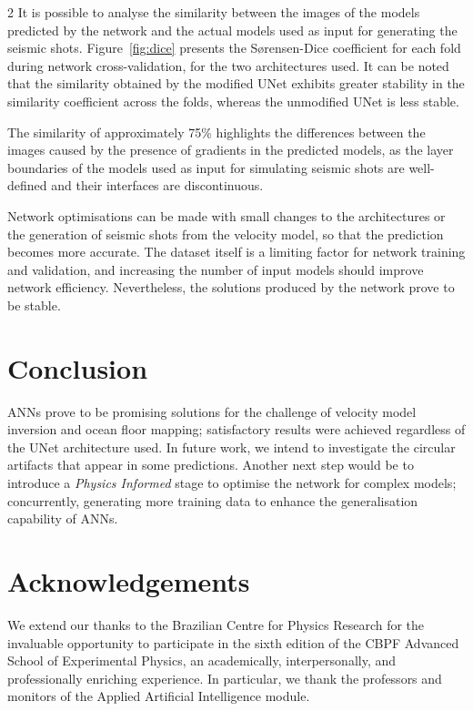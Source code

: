 \documentclass[a4paper,twoside,12pt]{article}
\begin{document}
\begin{multicols}{2}
It is possible to analyse the similarity between the images of the models predicted by the network and the actual models used as input for generating the seismic shots. Figure~\ref{fig:dice} presents the Sørensen-Dice coefficient for each fold during network cross-validation, for the two architectures used. It can be noted that the similarity obtained by the modified UNet exhibits greater stability in the similarity coefficient across the folds, whereas the unmodified UNet is less stable.

The similarity of approximately 75\% highlights the differences between the images caused by the presence of gradients in the predicted models, as the layer boundaries of the models used as input for simulating seismic shots are well-defined and their interfaces are discontinuous.

Network optimisations can be made with small changes to the architectures or the generation of seismic shots from the velocity model, so that the prediction becomes more accurate. The dataset itself is a limiting factor for network training and validation, and increasing the number of input models should improve network efficiency. Nevertheless, the solutions produced by the network prove to be stable.

\section{Conclusion}

ANNs prove to be promising solutions for the challenge of velocity model inversion and ocean floor mapping; satisfactory results were achieved regardless of the UNet architecture used. In future work, we intend to investigate the circular artifacts that appear in some predictions. Another next step would be to introduce a \textit{Physics Informed} stage to optimise the network for complex models; concurrently, generating more training data to enhance the generalisation capability of ANNs.

\section{Acknowledgements} 

We extend our thanks to the Brazilian Centre for Physics Research for the invaluable opportunity to participate in the sixth edition of the CBPF Advanced School of Experimental Physics, an academically, interpersonally, and professionally enriching experience. In particular, we thank the professors and monitors of the Applied Artificial Intelligence module.


\end{multicols}
\end{document}
